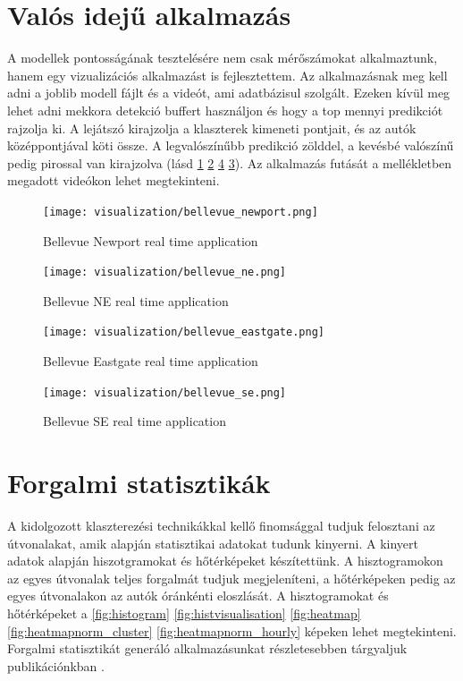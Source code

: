 \documentclass[12pt,a4paper]{article}
\begin{document}
\section{Valós idejű alkalmazás}
A modellek pontosságának tesztelésére nem csak mérőszámokat alkalmaztunk, hanem egy vizualizációs alkalmazást is fejlesztettem. Az alkalmazásnak meg kell adni
a joblib modell fájlt és a videót, ami adatbázisul szolgált. Ezeken kívül meg lehet adni mekkora detekció buffert használjon és hogy a top mennyi predikciót rajzolja ki.
A lejátszó kirajzolja a klaszterek kimeneti pontjait, és az autók középpontjával köti össze. A legvalószínűbb predikció zölddel, a kevésbé valószínű pedig pirossal
van kirajzolva (lásd \ref{BellevueNewportRealTime} \ref{fig: BellevueNERealTime} \ref{fig: BellevueSERealTime} \ref{fig: BellevueEastgateRealTime}).
Az alkalmazás futását a mellékletben megadott videókon lehet megtekinteni.

\begin{figure}[htbp]
    \texttt{[image: visualization/bellevue\_newport.png]}
    \caption{Bellevue Newport real time application}
    \label{BellevueNewportRealTime}
\end{figure}

\begin{figure}[htbp]
    \texttt{[image: visualization/bellevue\_ne.png]}
    \caption{Bellevue NE real time application}
    \label{fig: BellevueNERealTime}
\end{figure}

\begin{figure}[htbp]
    \texttt{[image: visualization/bellevue\_eastgate.png]}
    \caption{Bellevue Eastgate real time application}
    \label{fig: BellevueEastgateRealTime}
\end{figure}

\begin{figure}[htbp]
    \texttt{[image: visualization/bellevue\_se.png]}
    \caption{Bellevue SE real time application}
    \label{fig: BellevueSERealTime}
\end{figure}

\newpage
\section{Forgalmi statisztikák}
A kidolgozott klaszterezési technikákkal kellő finomsággal tudjuk felosztani az útvonalakat, amik alapján statisztikai adatokat tudunk kinyerni.
A kinyert adatok alapján hiszotgramokat és hőtérképeket készítettünk. A hisztogramokon az egyes útvonalak teljes forgalmát tudjuk megjeleníteni,
a hőtérképeken pedig az egyes útvonalakon az autók óránkénti eloszlását. A hisztogramokat és hőtérképeket a \ref{fig:histogram} \ref{fig:histvisualisation} \ref{fig:heatmap} \ref{fig:heatmapnorm_cluster} \ref{fig:heatmapnorm_hourly} képeken lehet megtekinteni.
Forgalmi statisztikát generáló alkalmazásunkat részletesebben tárgyaljuk publikációnkban \cite{aggpeterhorvath2023}. %
\end{document}
